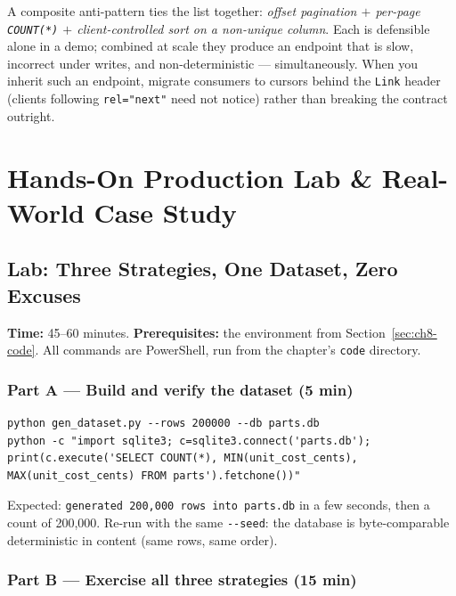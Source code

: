 \begin{warningbox}
A composite anti-pattern ties the list together: \emph{offset pagination
$+$ per-page \texttt{COUNT(*)} $+$ client-controlled sort on a non-unique
column}. Each is defensible alone in a demo; combined at scale they produce
an endpoint that is slow, incorrect under writes, and non-deterministic ---
simultaneously. When you inherit such an endpoint, migrate consumers to
cursors behind the \texttt{Link} header (clients following \texttt{rel="next"}
need not notice) rather than breaking the contract outright.
\end{warningbox}

\section{Hands-On Production Lab \& Real-World Case Study}
\label{sec:ch8-lab}

\subsection{Lab: Three Strategies, One Dataset, Zero Excuses}

\textbf{Time:} 45--60 minutes. \textbf{Prerequisites:} the environment from
Section~\ref{sec:ch8-code}. All commands are PowerShell, run from the
chapter's \texttt{code} directory.

\subsubsection{Part A --- Build and verify the dataset (5 min)}

\begin{verbatim}
python gen_dataset.py --rows 200000 --db parts.db
python -c "import sqlite3; c=sqlite3.connect('parts.db'); print(c.execute('SELECT COUNT(*), MIN(unit_cost_cents), MAX(unit_cost_cents) FROM parts').fetchone())"
\end{verbatim}

Expected: \texttt{generated 200,000 rows into parts.db} in a few seconds,
then a count of 200{,}000. Re-run with the same \texttt{-{}-seed}: the
database is byte-comparable deterministic in content (same rows, same
order).

\subsubsection{Part B --- Exercise all three strategies (15 min)}

